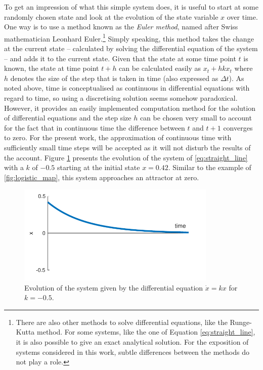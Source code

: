 To get an impression of what this simple system does, it is useful to start at some randomly chosen state and look at the evolution of the state variable $x$ over time. One way is to use a method known as the \emph{Euler method}, named after Swiss mathematician Leonhard Euler.\footnote{There are also other methods to solve differential equations, like the Runge-Kutta method. For some systems, like the one of Equation \ref{eq:straight_line}, it is also possible to give an exact analytical solution. For the exposition of systems considered in this work, subtle differences between the methods do not play a role.} Simply speaking, this method takes the change at the current state -- calculated by solving the differential equation of the system -- and adds it to the current state. Given that the state at some time point $t$ is known, the state at time point $t+h$ can be calculated easily as $x_t + hkx_t$ \citep{Fuchs2013} where $h$ denotes the size of the step that is taken in time (also expressed as $\Delta t$). As noted above, time is conceptualised as continuous in differential equations with regard to time, so using a discretising solution seems somehow paradoxical. However, it provides an easily implemented computation method for the solution of differential equations and the step size $h$ can be chosen very small to account for the fact that in continuous time the difference between $t$ and $t+1$ converges to zero. For the present work, the approximation of continuous time with sufficiently small time steps will be accepted as it will not disturb the results of the account. Figure \ref{fig:evolution_of_straight_line1} presents the evolution of the system of \ref{eq:straight_line} with a $k$ of $-0.5$ starting at the initial state $x = 0.42$. Similar to the example of \ref{fig:logistic_map}, this system approaches an attractor at zero.

\begin{figure}[htp]
\begin{center}
\includegraphics[width=9.5cm]{figures/ch3/evolution_of_straight_line1.pdf}
\caption{Evolution of the system given by the differential equation $\dot{x} = kx$ for $k = -0.5$.}
\label{fig:evolution_of_straight_line1}
\end{center}
\end{figure}

